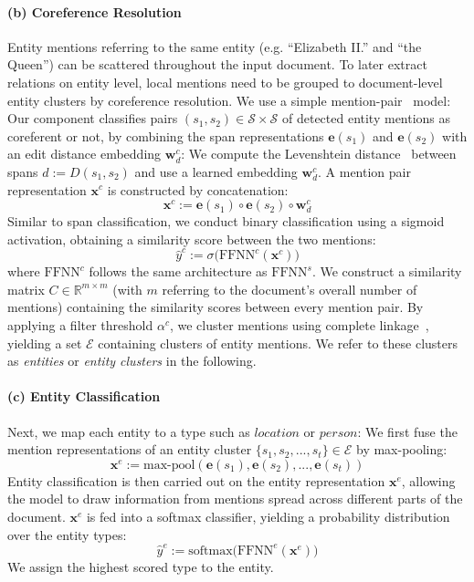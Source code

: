 \documentclass[11pt,a4paper]{article}
\begin{document}
\paragraph{(b) Coreference Resolution} Entity mentions referring to the same entity (e.g. \enquote{Elizabeth II.} and \enquote{the Queen}) can be scattered throughout the input document. To later extract relations on entity level, local mentions need to be grouped to document-level entity clusters by coreference resolution. We use a simple mention-pair~\cite{soon:2001:coref_mention_pair} model: Our component classifies pairs $(s_1,s_2) \in \mathcal{S} {\times} \mathcal{S}$ of detected entity mentions as coreferent or not, by combining
the span representations $\mathbf{e}(s_1)$ and $\mathbf{e}(s_2)$ with an edit distance embedding $\mathbf{w}_{d}^c$: We compute the Levenshtein distance~\cite{levenshtein:1966:levenshtein} between spans $d := D(s_1,s_2)$ and use a learned embedding $\mathbf{w}_{d}^c$.
A mention pair representation $\mathbf{x}^c$ is constructed by concatenation:
\begin{equation}
\label{eq:corefrepr}
\mathbf{x}^c := \mathbf{e}(s_1) \circ \mathbf{e}(s_2) \circ \mathbf{w}_{d}^c
\end{equation}
Similar to span classification, we conduct binary classification using a sigmoid activation, obtaining a similarity score between the two mentions: 
\begin{equation}
\label{eq:corefscore}
\hat{y}^c := \sigma \Big( \text{FFNN}^c(\mathbf{x}^c) \Big)
\end{equation}
where $\text{FFNN}^c$ follows the same architecture as $\text{FFNN}^s$.
We construct a similarity matrix $C \in \mathbb{R}^{m \times m}$ (with $m$ referring to the document's overall number of mentions) containing the similarity scores between every mention pair. By applying a filter threshold $\alpha^c$, we cluster mentions using complete linkage~\cite{muellner:2011:clustering}, yielding a set $\mathcal{E}$ containing clusters of entity mentions. We refer to these clusters as \emph{entities} or \emph{entity clusters} in the following.

\paragraph{(c) Entity Classification} Next, we map each entity to a type such as $location$ or $person$: We first fuse the mention representations of an entity cluster $\{s_1, s_2, ..., s_t\} \in \mathcal{E}$ by max-pooling:
\begin{equation} 
\label{eq:entityrepr}
\mathbf{x}^e := \text{max-pool}(\mathbf{e}(s_1), \mathbf{e}(s_2), ..., \mathbf{e}(s_t))
\end{equation}
Entity classification is then carried out on the entity representation $\mathbf{x}^e$, allowing the model to draw information from mentions spread across different parts of the document. $\mathbf{x}^e$ is fed into a softmax classifier, yielding a probability distribution over the entity types:
\begin{equation}
\label{eq:corefclassifier}
\hat{y}^e := \text{softmax} \Big( \text{FFNN}^e(\mathbf{x}^e) \Big)
\end{equation}
We assign the highest scored type to the entity.
\end{document}
